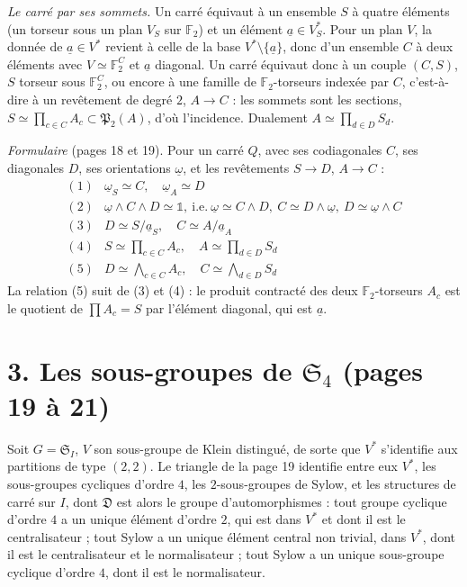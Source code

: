 \documentclass[11pt,a4paper]{article}
\begin{document}
\emph{Le carré par ses sommets.} Un carré équivaut à un ensemble $S$ à quatre
éléments (un torseur sous un plan $V_S$ sur $\mathbb{F}_2$) et un élément
$\underline{a} \in V_S^{*}$. Pour un plan $V$, la donnée de
$\underline{a} \in V^{*}$ revient à celle de la base $V^{*} \setminus
\{\underline{a}\}$, donc d'un ensemble $C$ à deux éléments avec
$V \simeq \mathbb{F}_2^{C}$ et $\underline{a}$ diagonal. Un carré équivaut donc
à un couple $(C, S)$, $S$ torseur sous $\mathbb{F}_2^{C}$, ou encore à une
famille de $\mathbb{F}_2$-torseurs indexée par $C$, c'est-à-dire à un
revêtement de degré $2$, $A \to C$ : les sommets sont les sections,
$S \simeq \prod_{c \in C} A_c \subset \mathfrak{P}_2(A)$, d'où l'incidence.
Dualement $A \simeq \prod_{d \in D} S_d$.

\emph{Formulaire} (pages 18 et 19). Pour un carré $Q$, avec ses codiagonales
$C$, ses diagonales $D$, ses orientations $\underline{\omega}$, et les
revêtements $S \to D$, $A \to C$ :
\[
\begin{array}{ll}
(1) & \underline{\omega}_S \simeq C, \quad \underline{\omega}_A \simeq D \\
(2) & \underline{\omega} \wedge C \wedge D \simeq \mathbb{1}, \ \text{i.e.}\
\underline{\omega} \simeq C \wedge D,\ C \simeq D \wedge \underline{\omega},\
D \simeq \underline{\omega} \wedge C \\
(3) & D \simeq S/\underline{a}_S, \quad C \simeq A/\underline{a}_A \\
(4) & S \simeq \prod_{c \in C} A_c, \quad A \simeq \prod_{d \in D} S_d \\
(5) & D \simeq \bigwedge_{c \in C} A_c, \quad C \simeq \bigwedge_{d \in D} S_d
\end{array}
\]
La relation (5) suit de (3) et (4) : le produit contracté des deux
$\mathbb{F}_2$-torseurs $A_c$ est le quotient de $\prod A_c = S$ par l'élément
diagonal, qui est $\underline{a}$.

\section*{3. Les sous-groupes de $\mathfrak{S}_4$ (pages 19 à 21)}

Soit $G = \mathfrak{S}_I$, $V$ son sous-groupe de Klein distingué, de sorte que
$V^{*}$ s'identifie aux partitions de type $(2,2)$. Le triangle de la page 19
identifie entre eux $V^{*}$, les sous-groupes cycliques d'ordre $4$, les
$2$-sous-groupes de Sylow, et les structures de carré sur $I$, dont
$\mathfrak{D}$ est alors le groupe d'automorphismes : tout groupe cyclique
d'ordre $4$ a un unique élément d'ordre $2$, qui est dans $V^{*}$ et dont il est
le centralisateur ; tout Sylow a un unique élément central non trivial, dans
$V^{*}$, dont il est le centralisateur et le normalisateur ; tout Sylow a un
unique sous-groupe cyclique d'ordre $4$, dont il est le normalisateur.
\end{document}
